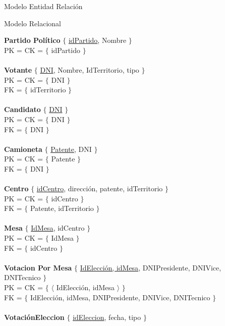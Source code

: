 \begin{section}{Modelo Entidad Relaci\'on}

\begin{subsection}{Modelo Relacional}

\noindent \textbf{Partido Pol\'itico} $\lbrace$ \underline{idPartido}, Nombre $\rbrace$ \\
PK = CK = $ \lbrace $ idPartido $ \rbrace $ \\
\\
\textbf{Votante} $ \lbrace $ \underline{DNI}, Nombre, IdTerritorio, tipo $ \rbrace $\\
PK = CK = $ \lbrace $ DNI $ \rbrace $\\
FK = $ \lbrace $ idTerritorio $ \rbrace $\\
\\
\textbf{Candidato} $ \lbrace $ \underline{DNI} $ \rbrace $\\
PK = CK = $ \lbrace $ DNI $ \rbrace $\\
FK = $ \lbrace $ DNI $ \rbrace $\\
\\
\textbf{Camioneta} $ \lbrace $ \underline{Patente}, DNI $ \rbrace $\\
PK = CK = $ \lbrace $ Patente  $ \rbrace $\\
FK = $ \lbrace $ DNI $ \rbrace $\\
\\
\textbf{Centro} $ \lbrace $ \underline{idCentro}, direcci\'on, patente, idTerritorio $ \rbrace $ \\
PK = CK = $ \lbrace $ idCentro $ \rbrace $ \\
FK = $ \lbrace $ Patente, idTerritorio $ \rbrace $\\
\\
\textbf{Mesa} $ \lbrace $ \underline{IdMesa}, idCentro $ \rbrace $ \\
PK = CK = $ \lbrace $ IdMesa $ \rbrace $ \\
FK = $ \lbrace $ idCentro $ \rbrace $\\
\\
\textbf{Votacion Por Mesa} $ \lbrace $ \underline{IdElecci\'on, idMesa}, DNIPresidente, DNIVice, DNITecnico $ \rbrace $ \\
PK = CK = $ \lbrace $ $ \langle $ IdElecci\'on, idMesa $ \rangle $ $ \rbrace $ \\
FK = $ \lbrace $ IdElecci\'on, idMesa, DNIPresidente, DNIVice, DNITecnico $ \rbrace $\\
\\
\textbf{Votaci\'onEleccion} $ \lbrace $ \underline{idEleccion}, fecha, tipo $ \rbrace $ \\

\end{subsection}
\end{section}
